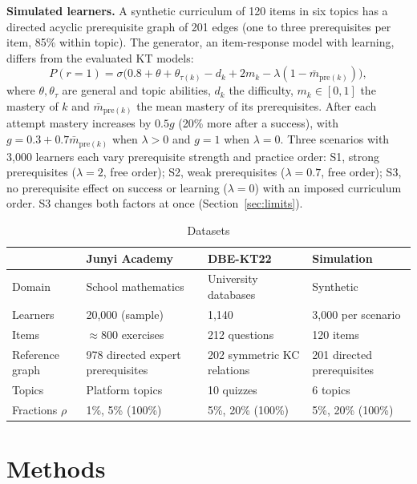\documentclass[lettersize,journal]{IEEEtran}
\begin{document}
\textbf{Simulated learners.} A synthetic curriculum of 120 items in six topics has a directed acyclic prerequisite graph of 201 edges (one to three prerequisites per item, 85\% within topic). The generator, an item-response model with learning, differs from the evaluated KT models:
\begin{equation}
P(r=1)=\sigma\!\big(0.8+\theta+\theta_{\tau(k)}-d_k+2m_k-\lambda(1-\bar m_{\mathrm{pre}(k)})\big),
\end{equation}
where $\theta,\theta_\tau$ are general and topic abilities, $d_k$ the difficulty, $m_k\in[0,1]$ the mastery of $k$ and $\bar m_{\mathrm{pre}(k)}$ the mean mastery of its prerequisites. After each attempt mastery increases by $0.5g$ (20\% more after a success), with $g=0.3+0.7\bar m_{\mathrm{pre}(k)}$ when $\lambda>0$ and $g=1$ when $\lambda=0$. Three scenarios with 3{,}000 learners each vary prerequisite strength and practice order: S1, strong prerequisites ($\lambda=2$, free order); S2, weak prerequisites ($\lambda=0.7$, free order); S3, no prerequisite effect on success or learning ($\lambda=0$) with an imposed curriculum order. S3 changes both factors at once (Section~\ref{sec:limits}).

\begin{table}[t]
\centering
\caption{Datasets}
\label{tab:data}
\footnotesize
\setlength{\tabcolsep}{3pt}
\begin{tabular}{@{}p{1.55cm}p{2.05cm}p{2.05cm}p{1.75cm}@{}}
\toprule
 & Junyi Academy & DBE-KT22 & Simulation \\
\midrule
Domain & School mathematics & University databases & Synthetic \\
Learners & 20{,}000 (sample) & 1{,}140 & 3{,}000 per scenario \\
Items & $\approx$800 exercises & 212 questions & 120 items \\
Reference graph & 978 directed expert prerequisites & 202 symmetric KC relations & 201 directed prerequisites \\
Topics & Platform topics & 10 quizzes & 6 topics \\
Fractions $\rho$ & 1\%, 5\% (100\%) & 5\%, 20\% (100\%) & 5\%, 20\% (100\%) \\
\bottomrule
\end{tabular}
\end{table}

\section{Methods}
\end{document}
